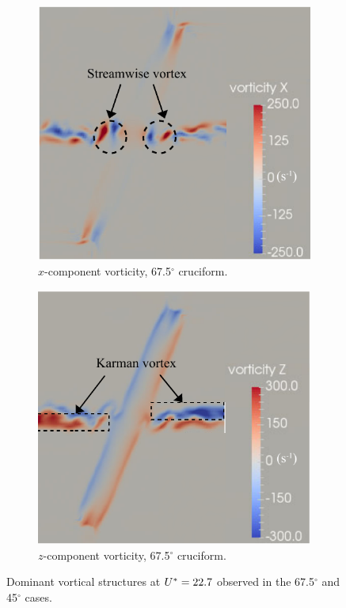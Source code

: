 \documentclass[oneside]{utmthesis}
\begin{document}
\begin{figure}
  \centering
  \begin{subfigure}[h]{0.6\textwidth}
    \centering
    \includegraphics[width=\textwidth]{figs/vorx675}
    \caption{$x$-component vorticity, 67.5$^{\circ}$ cruciform.}
    \label{fig:vorx675}
  \end{subfigure}

  \begin{subfigure}[h]{0.6\textwidth}
    \centering
    \includegraphics[width=\textwidth]{figs/vorz675}
    \caption{$z$-component vorticity, 67.5$^{\circ}$ cruciform.}
    \label{fig:vorz675}
  \end{subfigure}
  \caption{Dominant vortical structures at $U^{*} = 22.7$ observed in the 67.5$^{\circ}$ and 45$^{\circ}$ cases.}
\end{figure}
\end{document}
